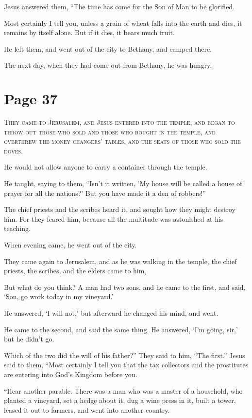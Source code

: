 Jesus answered them, “The time has come for the Son of Man to be glorified.

Most certainly I tell you, unless a grain of wheat falls into the earth and dies, it remains by itself alone. But if it dies, it bears much fruit.

He left them, and went out of the city to Bethany, and camped there.

The next day, when they had come out from Bethany, he was hungry.



\chapterornament
\section*{Page 37}

\lettrine{T}{hey came to Jerusalem, and Jesus entered into the temple, and began to throw out those who sold and those who bought in the temple, and overthrew the money changers’ tables, and the seats of those who sold the doves.}

He would not allow anyone to carry a container through the temple.

He taught, saying to them, “Isn’t it written, ‘My house will be called a house of prayer for all the nations?’ But you have made it a den of robbers!”

The chief priests and the scribes heard it, and sought how they might destroy him. For they feared him, because all the multitude was astonished at his teaching.

When evening came, he went out of the city.

They came again to Jerusalem, and as he was walking in the temple, the chief priests, the scribes, and the elders came to him,

But what do you think? A man had two sons, and he came to the first, and said, ‘Son, go work today in my vineyard.’

He answered, ‘I will not,’ but afterward he changed his mind, and went.

He came to the second, and said the same thing. He answered, ‘I’m going, sir,’ but he didn’t go.

Which of the two did the will of his father?” They said to him, “The first.” Jesus said to them, “Most certainly I tell you that the tax collectors and the prostitutes are entering into God’s Kingdom before you.

“Hear another parable. There was a man who was a master of a household, who planted a vineyard, set a hedge about it, dug a wine press in it, built a tower, leased it out to farmers, and went into another country.

